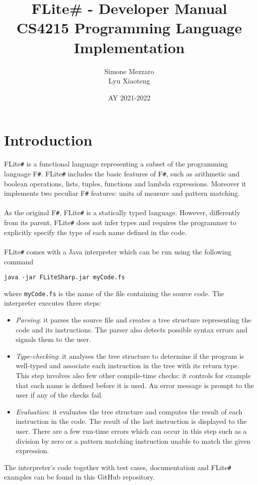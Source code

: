 \documentclass[]{article}
\title{\huge FLite\# - Developer Manual\\ \vspace{20pt} \large CS4215 Programming Language Implementation}
\author{Simone Mezzaro\\Lyu Xiaoteng}
\date{AY 2021-2022}
\begin{document}
	\maketitle
	\newpage
	\tableofcontents
	\newpage
	
	\section{Introduction}
	\label{sec:introduction}
		FLite\verb|#| is a functional language representing a subset of the programming language F\verb|#|. FLite\verb|#| includes the basic features of F\verb|#|, such as arithmetic and boolean operations, lists, tuples, functions and lambda expressions. Moreover it implements two peculiar F\verb|#| features: units of measure and pattern matching.\\\\
		As the original F\verb|#|, FLite\verb|#| is a statically typed language. However, differently from its parent, FLite\verb|#| does not infer types and requires the programmer to explicitly specify the type of each name defined in the code.\\\\
		FLite\verb|#| comes with a Java interpreter which can be run using the following command 
		\begin{center}
			\lstinline|java -jar FLiteSharp.jar myCode.fs|
		\end{center}
		where \lstinline|myCode.fs| is the name of the file containing the source code. The interpreter executes three steps:
		\begin{itemize}
			\item \textit{Parsing}: it parses the source file and creates a tree structure representing the code and its instructions. The parser also detects possible syntax errors and signals them to the user.
			\item \textit{Type-checking}: it analyses the tree structure to determine if the program is well-typed and associate each instruction in the tree with its return type. This step involves also few other compile-time checks: it controls for example that each name is defined before it is used. An error message is prompt to the user if any of the checks fail.
			\item \textit{Evaluation}: it evaluates the tree structure and computes the result of each instruction in the code. The result of the last instruction is displayed to the user. There are a few run-time errors which can occur in this step such as a division by zero or a pattern matching instruction unable to match the given expression.
		\end{itemize}
		The interpreter's code together with test cases, documentation and FLite\verb|#| examples can be found in this GitHub repository.
	
\end{document}
